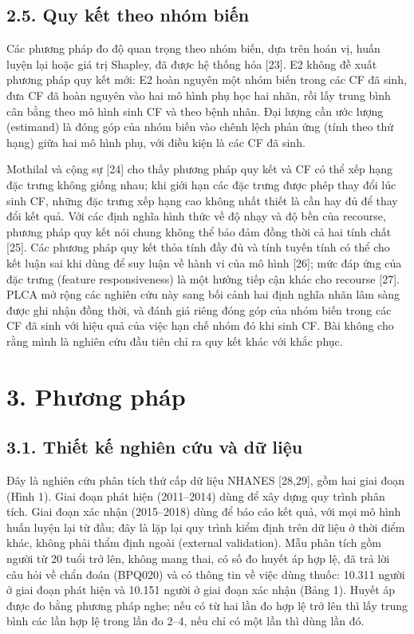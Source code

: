 \documentclass[9pt,a4paper]{extarticle}
\begin{document}
\subsection{2.5. Quy kết theo nhóm biến}

Các phương pháp đo độ quan trọng theo nhóm biến, dựa trên hoán vị, huấn
luyện lại hoặc giá trị Shapley, đã được hệ thống hóa {[}23{]}. E2 không
đề xuất phương pháp quy kết mới: E2 hoàn nguyên một nhóm biến trong các
CF đã sinh, đưa CF đã hoàn nguyên vào hai mô hình phụ học hai nhãn, rồi
lấy trung bình cân bằng theo mô hình sinh CF và theo bệnh nhân. Đại
lượng cần ước lượng (estimand) là đóng góp của nhóm biến vào chênh lệch
phản ứng (tính theo thứ hạng) giữa hai mô hình phụ, với điều kiện là các
CF đã sinh.

Mothilal và cộng sự {[}24{]} cho thấy phương pháp quy kết và CF có thể
xếp hạng đặc trưng không giống nhau; khi giới hạn các đặc trưng được
phép thay đổi lúc sinh CF, những đặc trưng xếp hạng cao không nhất thiết
là cần hay đủ để thay đổi kết quả. Với các định nghĩa hình thức về độ
nhạy và độ bền của recourse, phương pháp quy kết nói chung không thể bảo
đảm đồng thời cả hai tính chất {[}25{]}. Các phương pháp quy kết thỏa
tính đầy đủ và tính tuyến tính có thể cho kết luận sai khi dùng để suy
luận về hành vi của mô hình {[}26{]}; mức đáp ứng của đặc trưng (feature
responsiveness) là một hướng tiếp cận khác cho recourse {[}27{]}. PLCA
mở rộng các nghiên cứu này sang bối cảnh hai định nghĩa nhãn lâm sàng
được ghi nhận đồng thời, và đánh giá riêng đóng góp của nhóm biến trong
các CF đã sinh với hiệu quả của việc hạn chế nhóm đó khi sinh CF. Bài
không cho rằng mình là nghiên cứu đầu tiên chỉ ra quy kết khác với khắc
phục.

\section{3. Phương pháp}

\subsection{3.1. Thiết kế nghiên cứu và dữ liệu}

Đây là nghiên cứu phân tích thứ cấp dữ liệu NHANES {[}28,29{]}, gồm hai
giai đoạn (Hình 1). Giai đoạn phát hiện (2011--2014) dùng để xây dựng
quy trình phân tích. Giai đoạn xác nhận (2015--2018) dùng để báo cáo kết
quả, với mọi mô hình huấn luyện lại từ đầu; đây là lặp lại quy trình
kiểm định trên dữ liệu ở thời điểm khác, không phải thẩm định ngoài
(external validation). Mẫu phân tích gồm người từ 20 tuổi trở lên, không
mang thai, có số đo huyết áp hợp lệ, đã trả lời câu hỏi về chẩn đoán
(BPQ020) và có thông tin về việc dùng thuốc: 10.311 người ở giai đoạn
phát hiện và 10.151 người ở giai đoạn xác nhận (Bảng 1). Huyết áp được
đo bằng phương pháp nghe; nếu có từ hai lần đo hợp lệ trở lên thì lấy
trung bình các lần hợp lệ trong lần đo 2--4, nếu chỉ có một lần thì dùng
lần đó.
\end{document}
